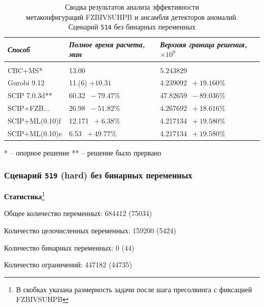 \documentclass[%
	11pt,
	a4paper,
	utf8,
		]{article}
\begin{document}
{
	\begin{table}[!h]
		\centering
		\caption{Сводка результатов анализа эффективности \\метаконфигураций FZBIVSUHPB и ансамбля детекторов аномалий. \\Сценарий \texttt{514} без бинарных переменных}
		\begin{tabular}{ p{2.7cm} p{3.3cm} p{3.4cm} }
			\emph{Способ} & \emph{Полное время расчета, мин} & \emph{Верхняя граница решения, $ \times 10^{9} $} \\
			\hline\hline\\[-3.5mm]
			{CBC+MS}* & 13.00 & $ 5.243829 $ \\
			\hline
			Gurobi 9.12 & 11.(6) {\color{blue} $ +10.31 $} & $ 4.239092 $ {\color{blue} $\ +19.160 $\%} \\
			\hline
			SCIP 7.0.3d** & 60.32 {\color{red} $\ -79.47 $\%} & $ 47.82659 $ {\color{red} $\ -89.036 $\%} \\
			\hline
			SCIP+FZB... & 26.98 {\color{red} $\ -51.82 $\%} & $ 4.267692 $ {\color{blue} $\ +18.616 $\%} \\
			\hline
			SCIP+ML(0.10)f & 12.171 {\color{blue} $\ +6.38 $\%} & 4.217134 {\color{blue} $\ +19.580 $\%} \\
			\hline
			SCIP+ML(0.10)e & 6.53  {\color{blue} $\ +49.77 $\%} & 4.217134 {\color{blue} $\ +19.580 $\%}
		\end{tabular}\label{tab:514_wo_bins}
	\end{table}
\vspace{-5mm}\hspace{30mm}\small{* -- опорное решение}
\hspace{15mm}\small{** -- решение было прервано}
}

\subsubsection{Сценарий \texttt{519} (hard) без бинарных переменных}

\textbf{Статистика}\footnote{В скобках указана размерность задачи после шага пресолвинга с фиксацией FZBIVSUHPB}\vspace*{1mm}

Общее количество переменных: 684412 (75034)

Количество целочисленных переменных: 159200 (5424)

Количество бинарных переменных: 0 (44)

Количество ограничений: 447182 (44735)
\end{document}
